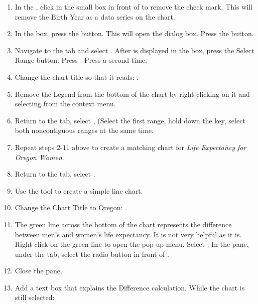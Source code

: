 \begin{enumerate}[resume]
	\item In the , click in the small box in front of  to remove the check mark. This will remove the Birth Year as a data series on the chart.
	\item In the  box, press the  button. This will open the  dialog box. Press the  button.
	\item Navigate to the  tab and select . After  is displayed in the box, press the Select Range button. Press . Press  a second time.
	\item Change the chart title so that it reads: .
	\item Remove the Legend from the bottom of the chart by right-clicking on it and selecting  from the context menu.
	\item Return to the  tab, select ,  (Select the first range, hold down the  key, select both noncontiguous ranges at the same time.
	\item Repeat steps $ 2 $-$ 11 $ above to create a matching chart for \textit{Life Expectancy for Oregon Women}.
	\item Return to the  tab, select .
	\item Use the  tool to create a simple line chart.
	\item Change the Chart Title to Oregon: .
	\item The green line across the bottom of the chart represents the difference between men's and women's life expectancy. It is not very helpful as it is. Right click on the green line to open the pop up menu. Select . In the  pane, under the  tab, select the radio button in front of .
	\item Close the  pane.
	\item Add a text box that explains the Difference calculation. While the chart is still selected:
	

\end{enumerate}
